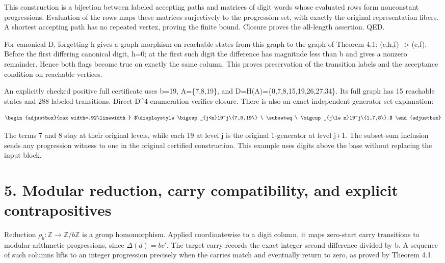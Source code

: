 This construction is a bijection between labeled accepting paths and matrices of digit words whose evaluated rows form nonconstant progressions. Evaluation of the rows maps these matrices surjectively to the progression set, with exactly the original representation fibers. A shortest accepting path has no repeated vertex, proving the finite bound. Closure proves the all-length assertion. QED.

For canonical D, forgetting h gives a graph morphism on reachable states from this graph to the graph of Theorem 4.1: (c,h,f) -\textgreater{} (c,f). Before the first differing canonical digit, h=0; at the first such digit the difference has magnitude less than b and gives a nonzero remainder. Hence both flags become true on exactly the same column. This proves preservation of the transition labels and the acceptance condition on reachable vertices.

An explicitly checked positive full certificate uses b=19, A=\{7,8,19\}, and D=H(A)=\{0,7,8,15,19,26,27,34\}. Its full graph has 15 reachable states and 288 labeled transitions. Direct D\^{}4 enumeration verifies closure. There is also an exact independent generator-set explanation:

\[
\begin{adjustbox}{max width=.92\linewidth}
$\displaystyle \bigcup_{j<m}19^j\{7,8,19\}
\ \subseteq\ \bigcup_{j\le m}19^j\{1,7,8\}.$
\end{adjustbox}
\]

The terms 7 and 8 stay at their original levels, while each 19 at level j is the original 1-generator at level j+1. The subset-sum inclusion sends any progression witness to one in the original certified construction. This example uses digits above the base without replacing the input block.

\section{5. Modular reduction, carry compatibility, and explicit contrapositives}\label{n03-modular-reduction-carry-compatibility-and-explicit-contrapositives}

Reduction \(\rho_b:\mathbb Z\to\mathbb Z/b\mathbb Z\) is a group homomorphism. Applied coordinatewise to a digit column, it maps zero-start carry transitions to modular arithmetic progressions, since \(\Delta(d)=bc'\). The target carry records the exact integer second difference divided by b. A sequence of such columns lifts to an integer progression precisely when the carries match and eventually return to zero, as proved by Theorem 4.1.

